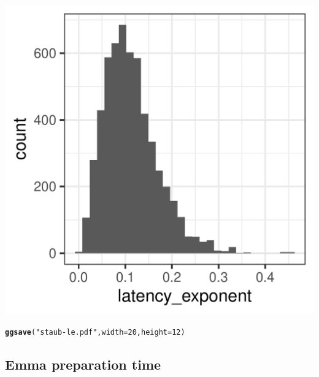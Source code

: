 \documentclass{article}\usepackage[]{graphicx}\usepackage[]{color}
\makeatletter
\def\maxwidth{ %
  \ifdim\Gin@nat@width>\linewidth
    \linewidth
  \else
    \Gin@nat@width
  \fi
}
\newcommand{\hlnum}[1]{\textcolor[rgb]{0.686,0.059,0.569}{#1}}%
\newcommand{\hlstr}[1]{\textcolor[rgb]{0.192,0.494,0.8}{#1}}%
\newcommand{\hlstd}[1]{\textcolor[rgb]{0.345,0.345,0.345}{#1}}%
\newcommand{\hlkwc}[1]{\textcolor[rgb]{0.333,0.667,0.333}{#1}}%
\newcommand{\hlkwd}[1]{\textcolor[rgb]{0.737,0.353,0.396}{\textbf{#1}}}%
\newenvironment{kframe}{%
 \def\at@end@of@kframe{}%
 \ifinner\ifhmode%
  \def\at@end@of@kframe{\end{minipage}}%
  \begin{minipage}{\columnwidth}%
 \fi\fi%
 \def\FrameCommand##1{\hskip\@totalleftmargin \hskip-\fboxsep
 \colorbox{shadecolor}{##1}\hskip-\fboxsep
     \hskip-\linewidth \hskip-\@totalleftmargin \hskip\columnwidth}%
 \MakeFramed {\advance\hsize-\width
   \@totalleftmargin\z@ \linewidth\hsize
   \@setminipage}}%
 {\par\unskip\endMakeFramed%
 \at@end@of@kframe}
\newenvironment{knitrout}{}{} %
\makeatother
\begin{document}
\begin{knitrout}
\begin{kframe}
{\ttfamily\noindent\itshape\color{messagecolor}{\#\# `stat\_bin()` using `bins = 30`. Pick better value with `binwidth`.}}\end{kframe}
\includegraphics[width=\maxwidth]{figures/figure_staub_exp3unnamed-chunk-20-1} 
\begin{kframe}\begin{alltt}
\hlkwd{ggsave}\hlstd{(}\hlstr{"staub-le.pdf"}\hlstd{,} \hlkwc{width} \hlstd{=} \hlnum{20}\hlstd{,} \hlkwc{height} \hlstd{=} \hlnum{12}\hlstd{)}
\end{alltt}


{\ttfamily\noindent\itshape\color{messagecolor}{\#\# `stat\_bin()` using `bins = 30`. Pick better value with `binwidth`.}}\end{kframe}
\end{knitrout}

\subsection{Emma preparation time}
\end{document}
